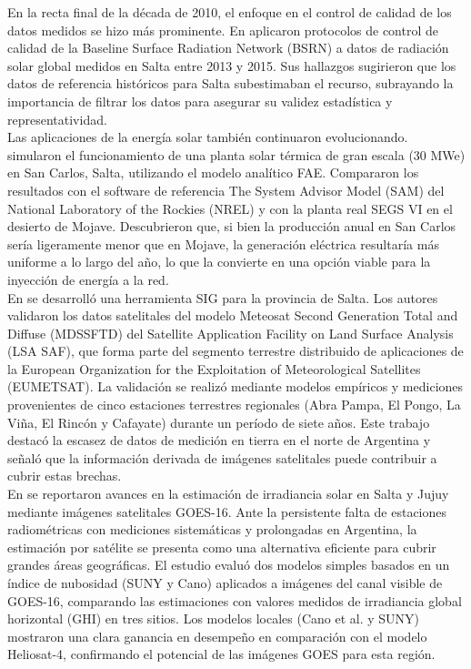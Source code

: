 En la recta final de la década de 2010, el enfoque en el control de calidad de los datos medidos se hizo más prominente. En \cite{RomanoArmada2017} aplicaron protocolos de control de calidad de la Baseline Surface Radiation Network (BSRN) a datos de radiación solar global medidos en Salta entre 2013 y 2015. Sus hallazgos sugirieron que los datos de referencia históricos para Salta subestimaban el recurso, subrayando la importancia de filtrar los datos para asegurar su validez estadística y representatividad.\\

Las aplicaciones de la energía solar también continuaron evolucionando. \cite{Hongn2018} simularon el funcionamiento de una planta solar térmica de gran escala (30 MWe) en San Carlos, Salta, utilizando el modelo analítico FAE. Compararon los resultados con el software de referencia The System Advisor Model (SAM) del National Laboratory of the Rockies (NREL) y con la planta real SEGS VI en el desierto de Mojave. Descubrieron que, si bien la producción anual en San Carlos sería ligeramente menor que en Mojave, la generación eléctrica resultaría más uniforme a lo largo del año, lo que la convierte en una opción viable para la inyección de energía a la red.\\


En \cite{SarmientoBarbieri2019} se desarrolló una herramienta SIG para la provincia de Salta. Los autores validaron los datos satelitales del modelo Meteosat Second Generation Total and Diffuse (MDSSFTD) del Satellite Application Facility on Land Surface Analysis (LSA SAF), que forma parte del segmento terrestre distribuido de aplicaciones de la European Organization for the Exploitation of Meteorological Satellites (EUMETSAT). La validación se realizó mediante modelos empíricos y mediciones provenientes de cinco estaciones terrestres regionales (Abra Pampa, El Pongo, La Viña, El Rincón y Cafayate) durante un período de siete años. Este trabajo destacó la escasez de datos de medición en tierra en el norte de Argentina y señaló que la información derivada de imágenes satelitales puede contribuir a cubrir estas brechas.\\


En \cite{Ledesma2023} se reportaron avances en la estimación de irradiancia solar en Salta y Jujuy mediante imágenes satelitales GOES-16. Ante la persistente falta de estaciones radiométricas con mediciones sistemáticas y prolongadas en Argentina, la estimación por satélite se presenta como una alternativa eficiente para cubrir grandes áreas geográficas. El estudio evaluó dos modelos simples basados en un índice de nubosidad (SUNY y Cano) aplicados a imágenes del canal visible de GOES-16, comparando las estimaciones con valores medidos de irradiancia global horizontal (GHI) en tres sitios. Los modelos locales (Cano et al. y SUNY) mostraron una clara ganancia en desempeño en comparación con el modelo Heliosat-4, confirmando el potencial de las imágenes GOES para esta región.\\

